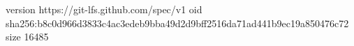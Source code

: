 version https://git-lfs.github.com/spec/v1
oid sha256:b8c0d966d3833c4ac3edeb9bba49d2d9bff2516da71ad441b9ec19a850476c72
size 16485
